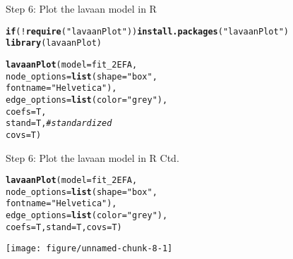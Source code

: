 \documentclass[10pt]{beamer}\usepackage[]{graphicx}\usepackage[]{xcolor}
\makeatletter
\def\maxwidth{ %
  \ifdim\Gin@nat@width>\linewidth
    \linewidth
  \else
    \Gin@nat@width
  \fi
}
\newcommand{\hlsng}[1]{\textcolor[rgb]{0.192,0.494,0.8}{#1}}%
\newcommand{\hlcom}[1]{\textcolor[rgb]{0.678,0.584,0.686}{\textit{#1}}}%
\newcommand{\hlopt}[1]{\textcolor[rgb]{0,0,0}{#1}}%
\newcommand{\hldef}[1]{\textcolor[rgb]{0.345,0.345,0.345}{#1}}%
\newcommand{\hlkwa}[1]{\textcolor[rgb]{0.161,0.373,0.58}{\textbf{#1}}}%
\newcommand{\hlkwc}[1]{\textcolor[rgb]{0.333,0.667,0.333}{#1}}%
\newcommand{\hlkwd}[1]{\textcolor[rgb]{0.737,0.353,0.396}{\textbf{#1}}}%
\newenvironment{kframe}{%
 \def\at@end@of@kframe{}%
 \ifinner\ifhmode%
  \def\at@end@of@kframe{\end{minipage}}%
  \begin{minipage}{\columnwidth}%
 \fi\fi%
 \def\FrameCommand##1{\hskip\@totalleftmargin \hskip-\fboxsep
 \colorbox{shadecolor}{##1}\hskip-\fboxsep
     \hskip-\linewidth \hskip-\@totalleftmargin \hskip\columnwidth}%
 \MakeFramed {\advance\hsize-\width
   \@totalleftmargin\z@ \linewidth\hsize
   \@setminipage}}%
 {\par\unskip\endMakeFramed%
 \at@end@of@kframe}
\newenvironment{knitrout}{}{} %
\makeatother
\begin{document}
\begin{frame}[fragile]{Step 6: Plot the lavaan model in R}

\begin{knitrout}
\color{fgcolor}\begin{kframe}
\begin{alltt}
\hlkwa{if} \hldef{(}\hlopt{!}\hlkwd{require}\hldef{(}\hlsng{"lavaanPlot"}\hldef{))} \hlkwd{install.packages}\hldef{(}\hlsng{"lavaanPlot"}\hldef{)}
\hlkwd{library}\hldef{(lavaanPlot)}
\end{alltt}
\end{kframe}
\end{knitrout}
\begin{knitrout}
\color{fgcolor}\begin{kframe}
\begin{alltt}
\hlkwd{lavaanPlot}\hldef{(}\hlkwc{model} \hldef{= fit_2EFA,}
           \hlkwc{node_options} \hldef{=} \hlkwd{list}\hldef{(}\hlkwc{shape} \hldef{=} \hlsng{"box"}\hldef{,}
                               \hlkwc{fontname} \hldef{=} \hlsng{"Helvetica"}\hldef{),}
           \hlkwc{edge_options} \hldef{=} \hlkwd{list}\hldef{(}\hlkwc{color} \hldef{=} \hlsng{"grey"}\hldef{),}
           \hlkwc{coefs} \hldef{= T,}
           \hlkwc{stand} \hldef{= T,} \hlcom{# standardized }
           \hlkwc{covs} \hldef{= T)}
\end{alltt}
\end{kframe}
\end{knitrout}
\end{frame}
%
\begin{frame}[fragile]{Step 6: Plot the lavaan model in R Ctd.}

\begin{knitrout}
\color{fgcolor}\begin{kframe}
\begin{alltt}
\hlkwd{lavaanPlot}\hldef{(}\hlkwc{model} \hldef{= fit_2EFA,}
           \hlkwc{node_options} \hldef{=} \hlkwd{list}\hldef{(}\hlkwc{shape} \hldef{=} \hlsng{"box"}\hldef{,}
                               \hlkwc{fontname} \hldef{=} \hlsng{"Helvetica"}\hldef{),}
           \hlkwc{edge_options} \hldef{=} \hlkwd{list}\hldef{(}\hlkwc{color} \hldef{=} \hlsng{"grey"}\hldef{),}
           \hlkwc{coefs} \hldef{= T,} \hlkwc{stand} \hldef{= T,} \hlkwc{covs} \hldef{= T)}
\end{alltt}
\end{kframe}
\texttt{[image: figure/unnamed-chunk-8-1]} 
\end{knitrout}
\end{frame}
\end{document}

